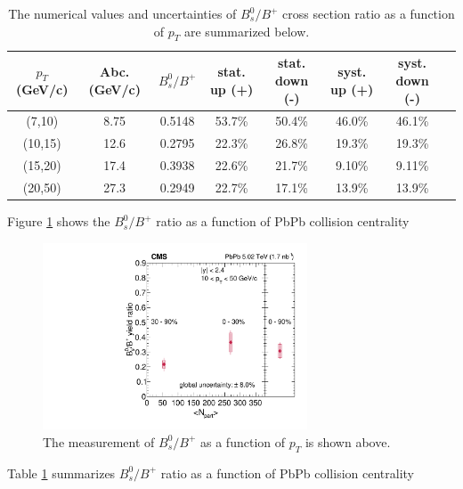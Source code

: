 \begin{table}[h]
\begin{center}
\caption{The numerical values and uncertainties of $B^0_s/B^+$ cross section ratio as a function of $p_T$ are summarized below.}
\vspace{1em}
\label{BsBPPtCMS}
  \begin{tabular}{| c | c |c | c| c| c| c| c|}
    \hline
  $p_T$ (GeV/c) & Abc. (GeV/c) & $B^0_s/B^+$ & stat. up (+) & stat. down (-)  & syst. up (+) & syst. down (-) \\
    \hline
    \hline
    (7,10) &  8.75&  0.5148 & 53.7\% & 50.4\%  &  46.0\% &  46.1\% \\
    (10,15) &12.6  &  0.2795 & 22.3\% & 26.8\%  & 19.3\% & 19.3\%  \\
    (15,20) &17.4  & 0.3938 & 22.6\% & 21.7\% & 9.10\% & 9.11\% \\
    (20,50) &27.3 & 0.2949 & 22.7\% & 17.1\% & 13.9\% & 13.9\%  \\
    \hline
    \hline
\end{tabular}
\end{center}
\end{table}


\clearpage

Figure \ref{BsBPCentDataONLY} shows the $B^0_s/B^+$ ratio as a function of PbPb collision centrality 


\begin{figure}[hbtp]
\begin{center}
\includegraphics[width=0.70\textwidth]{Figures/Chapter5/ratio_vsCent_ref0.pdf}
\caption{The measurement of $B^0_s/B^+$ as a function of $p_T$ is shown above.}
\label{BsBPCentDataONLY}
\end{center}
\end{figure}


Table \ref{BsBPPtCMS} summarizes $B^0_s/B^+$ ratio as a function of PbPb collision centrality


